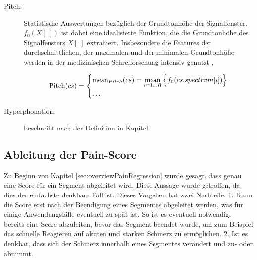 \begin{description}
\item[Pitch: ] Statistische Auswertungen bezüglich der Grundtonhöhe der Signalfenster. $f_0(X[\;])$ ist dabei eine idealisierte Funktion, die die Grundtonhöhe des Signalfensters $X[\;]$ extrahiert. Insbesondere die Features der durchschnittlichen, der maximalen und der minimalen Grundtonhöhe werden in der medizinischen Schreiforschung intensiv genutzt \cite[S. 158]{parentalPerception}, \cite[S. 84]{parentalPerception} \cite[S. 158]{threeCryTypes} \cite[S. 90]{25years}

\begin{equation}
\text{Pitch}(cs) = 
\begin{dcases}
	\text{mean}_{Pitch}(cs) = \operatorname*{mean}_{i=1\ldots R} \Big\{ f_0(cs.spectrum[i]) \Big\} \\
	\ldots
\end{dcases}
\end{equation}

\item[Hyperphonation: ] beschreibt nach der Definition in Kapitel 
	
\end{description}

 

\subsection{Ableitung der Pain-Score}
\label{sec:regressionPainScore}

Zu Beginn von Kapitel \ref{sec:overviewPainRegression} wurde gesagt, dass genau eine Score für ein Segment abgeleitet wird. Diese Aussage wurde getroffen, da dies der einfachste denkbare Fall ist. Dieses Vorgehen hat zwei Nachteile: 1. Kann die Score erst nach der Beendigung eines Segmentes abgeleitet werden, was für einige Anwendungsfälle eventuell zu spät ist. So ist es eventuell notwendig, bereits eine Score abzuleiten, bevor das Segment beendet wurde, um zum Beispiel das schnelle Reagieren auf akuten und starken Schmerz zu ermöglichen. 2. Ist es denkbar, dass sich der Schmerz innerhalb eines Segmentes verändert und zu- oder abnimmt.

